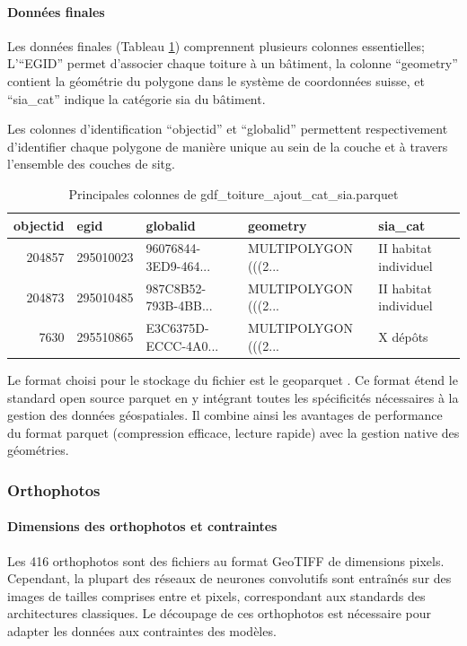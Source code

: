 \paragraph{Données finales}
Les données finales (Tableau \ref{tab:gdf_toiture_ajout_cat_sia_parquet_head}) comprennent plusieurs colonnes essentielles; L'``EGID'' permet d'associer chaque toiture à un bâtiment, la colonne ``geometry'' contient la géométrie du polygone dans le système de coordonnées suisse, et ``sia\_cat'' indique la catégorie \gls{sia} du bâtiment. 

Les colonnes d'identification ``objectid'' et ``globalid'' permettent respectivement d'identifier chaque polygone de manière unique au sein de la couche et à travers l'ensemble des couches de \acrshort{sitg}.

\begin{table}[H]
\renewcommand{\arraystretch}{2}
\begin{tabular}{@{}rlp{3cm}p{3cm}l@{}}
\toprule
objectid & egid & globalid & geometry & sia\_cat \\
\midrule
204857 & 295010023 & \parbox{3cm}{96076844-3ED9-464...} & \parbox{3cm}{MULTIPOLYGON (((2...} & II habitat individuel \\
204873 & 295010485 & \parbox{3cm}{987C8B52-793B-4BB...} & \parbox{3cm}{MULTIPOLYGON (((2...} & II habitat individuel \\
7630 & 295510865 & \parbox{3cm}{E3C6375D-ECCC-4A0...} & \parbox{3cm}{MULTIPOLYGON (((2...} & X dépôts \\
\bottomrule
\end{tabular}
\caption{Principales colonnes de gdf\_toiture\_ajout\_cat\_sia.parquet}
\label{tab:gdf_toiture_ajout_cat_sia_parquet_head}
\end{table}

Le format choisi pour le stockage du fichier est le geoparquet \cite{noauthor_geoparquet_nodate}. Ce format étend le standard open source parquet \cite{noauthor_parquet_nodate} en y intégrant toutes les spécificités nécessaires à la gestion des données géospatiales. Il combine ainsi les avantages de performance du format parquet (compression efficace, lecture rapide) avec la gestion native des géométries.

\newpage
\subsubsection{Orthophotos}
\label{subsubsec:decoupe_orthophoto_tuile}

\paragraph{Dimensions des orthophotos et contraintes}
Les 416 orthophotos sont des fichiers au format GeoTIFF de dimensions \si{} pixels. Cependant, la plupart des réseaux de neurones convolutifs sont entraînés sur des images de tailles comprises entre \si{} et \si{} pixels, correspondant aux standards des architectures classiques. Le découpage de ces orthophotos est nécessaire pour adapter les données aux contraintes des modèles.

